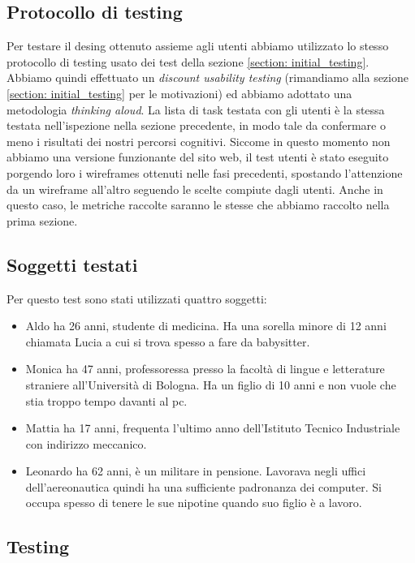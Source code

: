 \documentclass[../Report.tex]{subfiles}
\begin{document}
    \subsection{Protocollo di testing}
    Per testare il desing ottenuto assieme agli utenti abbiamo utilizzato lo stesso protocollo di testing usato dei test della sezione \ref*{section: initial_testing}. Abbiamo quindi effettuato un \emph{discount usability testing} (rimandiamo alla sezione \ref{section: initial_testing} per le motivazioni) ed abbiamo adottato una metodologia \emph{thinking aloud}. La lista di task testata con gli utenti è la stessa testata nell'ispezione nella sezione precedente, in modo tale da confermare o meno i risultati dei nostri percorsi cognitivi. Siccome in questo momento non abbiamo una versione funzionante del sito web, il test utenti è stato eseguito porgendo loro i wireframes ottenuti nelle fasi precedenti, spostando l'attenzione da un wireframe all'altro seguendo le scelte compiute dagli utenti. Anche in questo caso, 
    le metriche raccolte saranno le stesse che abbiamo raccolto nella prima sezione.
    \subsection{Soggetti testati}
    Per questo test sono stati utilizzati quattro soggetti:
    \begin{itemize}
        \item Aldo ha 26 anni, studente di medicina. Ha una sorella minore di 12 anni chiamata Lucia a cui si trova spesso a fare da babysitter.
        \item Monica ha 47 anni, professoressa presso la facoltà di lingue e letterature straniere all'Università di Bologna. Ha un figlio di 10 anni e non vuole che stia troppo tempo davanti al pc. 
        \item Mattia ha 17 anni, frequenta l'ultimo anno dell'Istituto Tecnico Industriale con indirizzo meccanico.
        \item Leonardo ha 62 anni, è un militare in pensione. Lavorava negli uffici dell'aereonautica quindi ha una sufficiente padronanza dei computer. Si occupa spesso di tenere le sue nipotine quando suo figlio è a lavoro. 
    \end{itemize}
    \subsection{Testing}
\end{document}
